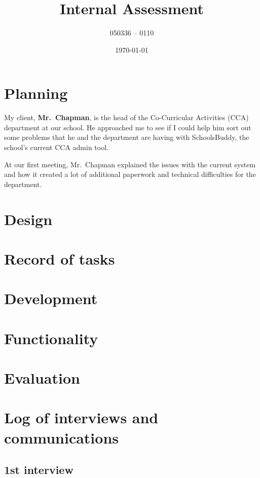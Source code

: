 \documentclass[numbers=endperiod, parskip=half-]{scrreprt}
\title{Internal Assessment}
\author{050336 -- 0110}
\date{\today}
\begin{document}
\maketitle

\tableofcontents

\chapter{Planning}

My client, \textbf{Mr.~Chapman},
is the head of the Co-Curricular Activities (CCA) department
at our school.
He approached me to see if I could help him sort out some problems
that he and the department are having with SchoolsBuddy,
the school's current CCA admin tool.

At our first meeting, Mr.~Chapman explained the issues with the
current system and how it created a lot of additional paperwork and
technical difficulties for the department.

\chapter{Design}

\chapter{Record of tasks}

\chapter{Development}

\chapter{Functionality}

\chapter{Evaluation}

\appendix

\chapter{Log of interviews and communications}

\section{1st interview}\label{first-interview}
\end{document}
